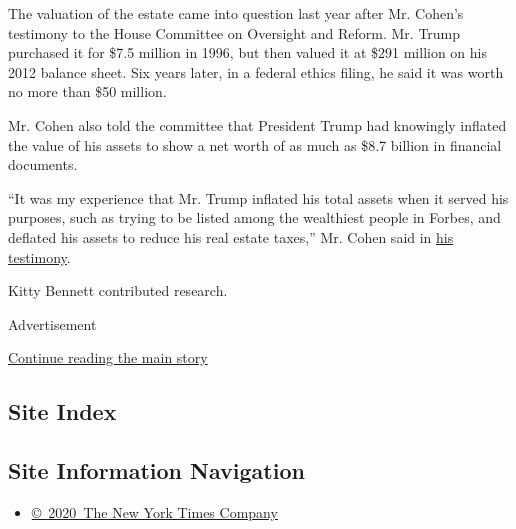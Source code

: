 The valuation of the estate came into question last year after Mr.
Cohen's testimony to the House Committee on Oversight and Reform. Mr.
Trump purchased it for \$7.5 million in 1996, but then valued it at
\$291 million on his 2012 balance sheet. Six years later, in a federal
ethics filing, he said it was worth no more than \$50 million.

Mr. Cohen also told the committee that President Trump had knowingly
inflated the value of his assets to show a net worth of as much as \$8.7
billion in financial documents.

``It was my experience that Mr. Trump inflated his total assets when it
served his purposes, such as trying to be listed among the wealthiest
people in Forbes, and deflated his assets to reduce his real estate
taxes,'' Mr. Cohen said in
\href{https://www.cnn.com/2019/02/27/politics/michael-cohen-trump-tax-returns-financials/index.html}{his
testimony}.

Kitty Bennett contributed research.

Advertisement

\protect\hyperlink{after-bottom}{Continue reading the main story}

\hypertarget{site-index}{%
\subsection{Site Index}\label{site-index}}

\hypertarget{site-information-navigation}{%
\subsection{Site Information
Navigation}\label{site-information-navigation}}

\begin{itemize}
\tightlist
\item
  \href{https://help.nytimes3xbfgragh.onion/hc/en-us/articles/115014792127-Copyright-notice}{©~2020~The
  New York Times Company}
\end{itemize}

